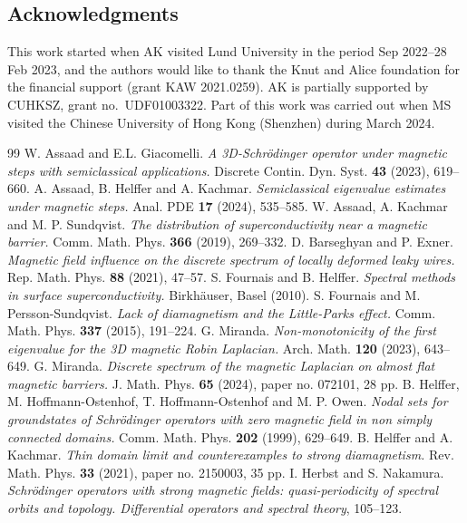 \documentclass[11pt]{amsart}
\theoremstyle{definition}
\numberwithin{equation}{section}
\begin{document}
\subsection*{Acknowledgments}
{\small This work started when AK visited Lund University in the period  Sep 2022--28 Feb 2023, and the authors would like to thank the Knut and Alice foundation for the financial support (grant KAW 2021.0259). AK is partially supported by CUHKSZ, grant no.\ UDF01003322. Part of this work was carried out when MS visited the Chinese University of Hong Kong (Shenzhen) during March 2024.}

\begin{thebibliography}{99}
%
 W. Assaad and E.L.  Giacomelli.
{\it A 3D-Schr\"odinger operator under magnetic steps with semiclassical applications. }
Discrete Contin. Dyn. Syst. {\bf 43} (2023),  619--660.
%
 A. Assaad, B. Helffer and A. Kachmar.
{\it Semiclassical eigenvalue estimates under magnetic steps.}
Anal. PDE {\bf 17} (2024), 535--585.
%
 W. Assaad, A. Kachmar and M. P. Sundqvist.
{\it The distribution of superconductivity near a magnetic barrier.}
Comm. Math. Phys. {\bf 366} (2019), 269--332.
%
 D. Barseghyan and P. Exner.
{\it Magnetic field influence on the discrete spectrum of locally deformed leaky wires.}
Rep. Math. Phys. {\bf 88} (2021), 47--57.
%
 S. Fournais and B. Helffer. {\it Spectral methods in surface superconductivity.} Birkh\"auser, Basel (2010).
%
 S. Fournais and  M. Persson-Sundqvist. {\it  Lack of diamagnetism and the Little-Parks effect.} Comm. Math. Phys. {\bf 337} (2015), 191--224.
%
 G. Miranda.
{\it Non-monotonicity of the first eigenvalue for the 3D magnetic Robin Laplacian.}
Arch. Math. {\bf 120} (2023), 643--649.
%
 G. Miranda.
{\it Discrete spectrum of the magnetic Laplacian on almost flat magnetic barriers.} J. Math. Phys. {\bf 65} (2024), paper no. 072101, 28 pp.
%
 B. Helffer, M. Hoffmann-Ostenhof, T. Hoffmann-Ostenhof and M. P. Owen.  {\it Nodal sets for groundstates of Schr\"odinger operators with zero magnetic field in non simply connected domains.} Comm. Math. Phys. {\bf 202} (1999), 629--649.
%
 B. Helffer and A. Kachmar.
{\it Thin domain limit and counterexamples to strong diamagnetism. }
Rev. Math. Phys. {\bf 33} (2021), paper no. 2150003, 35 pp.
%
 I. Herbst and S. Nakamura.
{\it Schr\"odinger operators with strong magnetic fields: quasi-periodicity of spectral orbits and topology. Differential operators and spectral theory}, 105--123.

\end{thebibliography}
\end{document}

